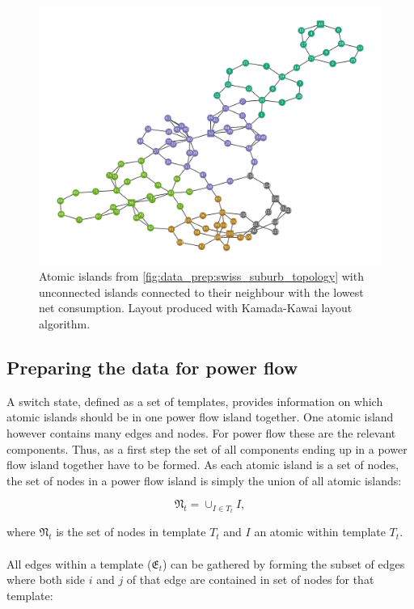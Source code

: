 \begin{figure}[H]
    \begin{center}
        \includegraphics[width=.8\linewidth]{img/switchstate_exploring/swiss_suburb/topology_sss_patched.png}
    \end{center}
    \caption{
        Atomic islands from \autoref{fig:data_prep:swiss_suburb_topology} with unconnected islands
        connected to their neighbour with the lowest net consumption. Layout produced with
        Kamada-Kawai layout algorithm\autocite{kamada_kawai}.
    }
    \label{fig:data_prep:swiss_suburb_topology_patched}
\end{figure}

\subsection{Preparing the data for power flow}

A switch state, defined as a set of templates, provides information
on which atomic islands should be in one power flow island together.
One atomic island however contains many edges and nodes. For power flow
these are the relevant components. Thus, as a first step the set of
all components ending up in a power flow island together have to be formed.
As each atomic island is a set of nodes, the set of nodes in a power flow
island is simply the union of all atomic islands:

\begin{equation}
    \mathfrak{N}_t = \cup_{I \in T_t} I,
\end{equation}

where $\mathfrak{N}_t$ is the set of nodes in template $T_t$
and $I$ an atomic within template $T_t$.\\
\\
All edges within a template ($\mathfrak{E}_t$) 
can be gathered by forming
the subset of edges where both side $i$ and $j$ of
that edge are contained in set of nodes for that template:

